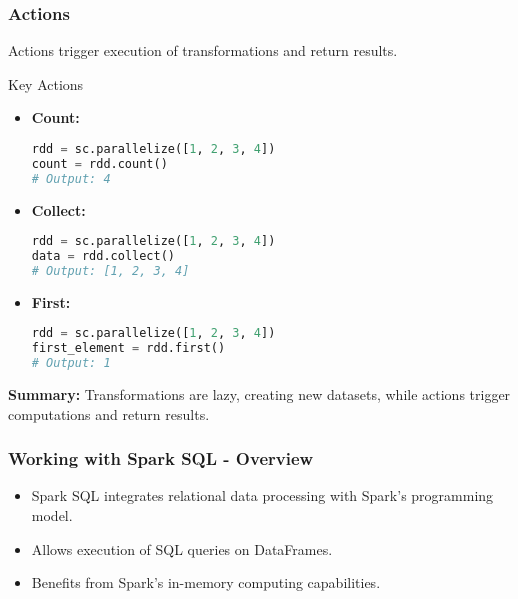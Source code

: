 \documentclass[aspectratio=169]{beamer}
\begin{document}
\begin{frame}[fragile]
    \frametitle{Actions}
    Actions trigger execution of transformations and return results.

    \begin{block}{Key Actions}
        \begin{itemize}
            \item \textbf{Count:}
            \begin{lstlisting}[language=Python]
rdd = sc.parallelize([1, 2, 3, 4])
count = rdd.count()
# Output: 4
            \end{lstlisting}

            \item \textbf{Collect:}
            \begin{lstlisting}[language=Python]
rdd = sc.parallelize([1, 2, 3, 4])
data = rdd.collect()
# Output: [1, 2, 3, 4]
            \end{lstlisting}

            \item \textbf{First:}
            \begin{lstlisting}[language=Python]
rdd = sc.parallelize([1, 2, 3, 4])
first_element = rdd.first()
# Output: 1
            \end{lstlisting}
        \end{itemize}
    \end{block}
    
    \textbf{Summary:} Transformations are lazy, creating new datasets, while actions trigger computations and return results.
\end{frame}

\begin{frame}[fragile]
    \frametitle{Working with Spark SQL - Overview}
    \begin{itemize}
        \item Spark SQL integrates relational data processing with Spark's programming model.
        \item Allows execution of SQL queries on DataFrames.
        \item Benefits from Spark's in-memory computing capabilities.
    \end{itemize}
\end{frame}
\end{document}
